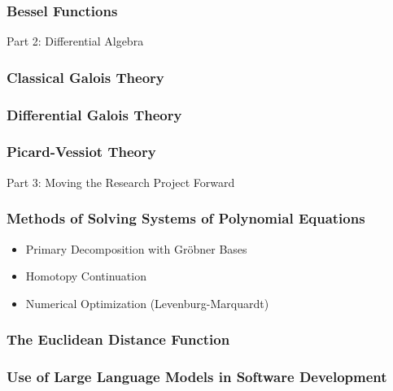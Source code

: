 \documentclass{beamer}
\begin{document}
\begin{frame}
\frametitle{Bessel Functions}
\end{frame}

\begin{frame}
\begin{exampleblock}{}
\begin{center}
\vskip 20pt
\Huge
Part 2: Differential Algebra
\vskip 6pt
\ 
\end{center}
\end{exampleblock}
\end{frame}

\begin{frame}
\frametitle{Classical Galois Theory}
\end{frame}

\begin{frame}
\frametitle{Differential Galois Theory}
\end{frame}

\begin{frame}
\frametitle{Picard-Vessiot Theory}
\end{frame}

\begin{frame}
\begin{exampleblock}{}
\begin{center}
\vskip 20pt
\Huge
Part 3: Moving the Research Project Forward
\vskip 6pt
\ 
\end{center}
\end{exampleblock}
\end{frame}

\begin{frame}
\frametitle{Methods of Solving Systems of Polynomial Equations}
\begin{itemize}
\item Primary Decomposition with Gr\"obner Bases
\item Homotopy Continuation
\item Numerical Optimization (Levenburg-Marquardt)
\end{itemize}
\end{frame}

\begin{frame}
\frametitle{The Euclidean Distance Function}
\end{frame}

\begin{frame}
\frametitle{Use of Large Language Models in Software Development}
\end{frame}
\end{document}
